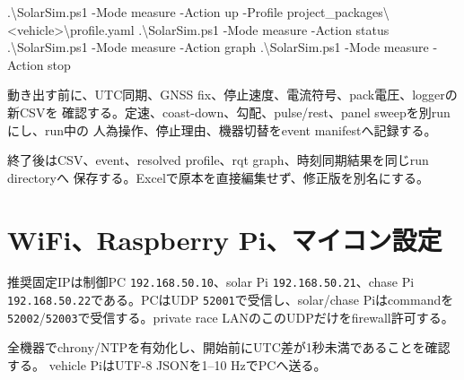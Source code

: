 \documentclass[
  japanese,
  a4paper,
]{article}
\newenvironment{Shaded}{}{}
\newcommand{\FunctionTok}[1]{\textcolor[rgb]{0.02,0.16,0.49}{#1}}
\newcommand{\NormalTok}[1]{#1}
\newcommand{\OperatorTok}[1]{\textcolor[rgb]{0.40,0.40,0.40}{#1}}
\begin{document}
\begin{Shaded}
\begin{Highlighting}[]
\OperatorTok{.}\NormalTok{\textbackslash{}SolarSim}\OperatorTok{.}\FunctionTok{ps1} \OperatorTok{{-}}\NormalTok{Mode }\FunctionTok{measure} \OperatorTok{{-}}\NormalTok{Action up }\OperatorTok{{-}}\NormalTok{Profile project\_packages\textbackslash{}}\OperatorTok{\textless{}}\NormalTok{vehicle}\OperatorTok{\textgreater{}}\NormalTok{\textbackslash{}profile}\OperatorTok{.}\FunctionTok{yaml}
\OperatorTok{.}\NormalTok{\textbackslash{}SolarSim}\OperatorTok{.}\FunctionTok{ps1} \OperatorTok{{-}}\NormalTok{Mode }\FunctionTok{measure} \OperatorTok{{-}}\NormalTok{Action status}
\OperatorTok{.}\NormalTok{\textbackslash{}SolarSim}\OperatorTok{.}\FunctionTok{ps1} \OperatorTok{{-}}\NormalTok{Mode }\FunctionTok{measure} \OperatorTok{{-}}\NormalTok{Action graph}
\OperatorTok{.}\NormalTok{\textbackslash{}SolarSim}\OperatorTok{.}\FunctionTok{ps1} \OperatorTok{{-}}\NormalTok{Mode }\FunctionTok{measure} \OperatorTok{{-}}\NormalTok{Action stop}
\end{Highlighting}
\end{Shaded}

動き出す前に、UTC同期、GNSS
fix、停止速度、電流符号、pack電圧、loggerの新CSVを
確認する。定速、coast-down、勾配、pulse/rest、panel
sweepを別runにし、run中の 人為操作、停止理由、機器切替をevent
manifestへ記録する。

終了後はCSV、event、resolved profile、rqt graph、時刻同期結果を同じrun
directoryへ 保存する。Excelで原本を直接編集せず、修正版を別名にする。

\section{WiFi、Raspberry
Pi、マイコン設定}\label{wifiraspberry-piux30deux30a4ux30b3ux30f3ux8a2dux5b9a}

推奨固定IPは制御PC \texttt{192.168.50.10}、solar Pi
\texttt{192.168.50.21}、chase Pi \texttt{192.168.50.22}である。PCはUDP
\texttt{52001}で受信し、solar/chase Piはcommandを
\texttt{52002}/\texttt{52003}で受信する。private race
LANのこのUDPだけをfirewall許可する。

全機器でchrony/NTPを有効化し、開始前にUTC差が1秒未満であることを確認する。
vehicle PiはUTF-8 JSONを1--10 HzでPCへ送る。
\end{document}
